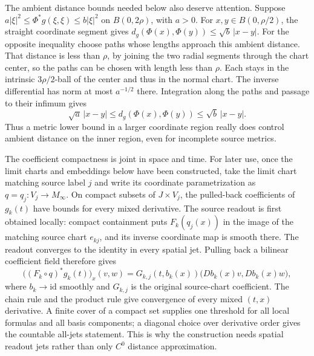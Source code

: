 The ambient distance bounds needed below also deserve attention.
Suppose $a|\xi|^2\leq\Phi^*g(\xi,\xi)\leq b|\xi|^2$ on
$B(0,2\rho)$, with $a>0$.  For $x,y\in B(0,\rho/2)$, the straight
coordinate segment gives
$d_g(\Phi(x),\Phi(y))\leq\sqrt b\,|x-y|$.
For the opposite inequality choose paths whose lengths approach this
ambient distance.  That distance is less than $\rho$, by joining the
two radial segments through the chart center, so the paths can be
chosen with length less than $\rho$.  Each stays in the intrinsic
$3\rho/2$-ball of the center and thus in the normal chart.
The inverse differential has norm at most $a^{-1/2}$ there.
Integration along the paths and passage to their infimum gives
\[
       \sqrt a\,|x-y|\leq d_g(\Phi(x),\Phi(y))
                         \leq\sqrt b\,|x-y|.
\]
Thus a metric lower bound in a larger coordinate region really does
control ambient distance on the inner region, even for incomplete
source metrics.

The coefficient compactness is joint in space and time.  For later use,
once the limit charts and embeddings below have been constructed,
take the limit chart matching source label $j$ and write its
coordinate parametrization as $q=q_j:V_j\to M_\infty$.
On compact subsets of $J\times V_j$, the pulled-back coefficients of
$g_k(t)$ have bounds for every mixed derivative.  The source readout
is first obtained locally: compact containment puts
$F_k(q_j(x))$ in the image of the matching source chart $e_{kj}$,
and its inverse
coordinate map is smooth there.  The readout converges to the identity
in every spatial jet.  Pulling back a bilinear coefficient field
therefore gives
\[
 \bigl((F_k\circ q)^*g_k(t)\bigr)_x(v,w)
 =G_{k,j}(t,b_k(x))
     \bigl(Db_k(x)v,Db_k(x)w\bigr),
\]
where $b_k\to\mathrm{id}$ smoothly and $G_{k,j}$ is the original
source-chart coefficient.  The chain rule and the product rule give
convergence of every mixed $(t,x)$ derivative.  A finite cover of a
compact set supplies one threshold for all local formulas and all basis
components; a diagonal choice over derivative order gives the
countable all-jets statement.  This is why the construction needs
spatial readout jets rather than only $C^0$ distance approximation.


